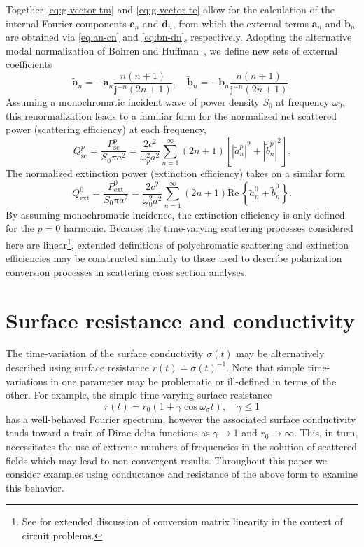 \documentclass[article]{IEEEtran}
\newcommand{\M}[1]{\mathbf{#1}}
\newcommand{\T}[1]{\mathrm{#1}}
\begin{document}
Together \eqref{eq:g-vector-tm} and \eqref{eq:g-vector-te} allow for the calculation of the internal Fourier components $\M{c}_n$ and $\M{d}_n$, from which the external terms $\M{a}_n$ and $\M{b}_n$ are obtained via \eqref{eq:an-cn} and \eqref{eq:bn-dn}, respectively.  Adopting the alternative modal normalization of Bohren and Huffman~\cite{bohren2008absorption}, we define new sets of external coefficients
\begin{equation}
    \tilde{\M{a}}_n = -\M{a}_n\frac{n(n+1)}{\T{j}^{-n}(2n+1)},\quad \tilde{\M{b}}_n = -\M{b}_n\frac{n(n+1)}{\T{j}^{-n}(2n+1)}.
\end{equation}
Assuming a monochromatic incident wave of power density $S_0$ at frequency $\omega_0$, this renormalization leads to a familiar form for the normalized net scattered power (scattering efficiency) at each frequency,
\begin{equation}
    Q_\T{sc}^p = \frac{P_\T{sc}^p}{S_0 \pi a^2} = \frac{2c^2}{\omega_p^2a^2}\sum_{n=1}^\infty (2n+1)\left[|\tilde{a}_n^p|^2 + |\tilde{b}_n^p|^2\right].
\end{equation}
The normalized extinction power (extinction efficiency) takes on a similar form
\begin{equation}
    Q_\T{ext}^0 = \frac{P_\T{ext}^0}{S_0 \pi a^2} = \frac{2c^2}{\omega_0^2a^2}\sum_{n=1}^\infty (2n+1)\T{Re}\,\left\{\tilde{a}_n^0 + \tilde{b}_n^0\right\}.
\end{equation}
By assuming monochromatic incidence, the extinction efficiency is only defined for the $p=0$ harmonic.  Because the time-varying scattering processes considered here are linear\footnote{See \cite[\S 3.4.1]{maas2003nonlinear} for extended discussion of conversion matrix linearity in the context of circuit problems.}, extended definitions of polychromatic scattering and extinction efficiencies may be constructed similarly to those used to describe polarization conversion processes in scattering cross section analyses.

\section{Surface resistance and conductivity}

The time-variation of the surface conductivity $\sigma(t)$ may be alternatively described using surface resistance $r(t) = \sigma(t)^{-1}$.  Note that simple time-variations in one parameter may be problematic or ill-defined in terms of the other.  For example, the simple time-varying surface resistance
\begin{equation}
    r(t) = r_0\left(1+\gamma\cos \omega_\sigma t\right),\quad \gamma\leq 1
    \label{eq:r-single-harm}
\end{equation}
has a well-behaved Fourier spectrum, however the associated surface conductivity tends toward a train of Dirac delta functions as $\gamma \rightarrow 1$ and $r_0\rightarrow \infty$.  This, in turn, necessitates the use of extreme numbers of frequencies in the solution of scattered fields which may lead to non-convergent results.  Throughout this paper we consider examples using conductance and resistance of the above form to examine this behavior.
\end{document}
